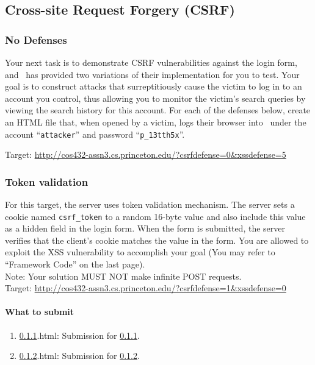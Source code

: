 \documentclass[letterpaper,12pt]{report}
\newcommand{\bungledomain}{http://cos432-assn3.cs.princeton.edu}
\begin{document}
\pagebreak

\subsection{Cross-site Request Forgery (CSRF)}
\label{sec:csrf}

\subsubsection{No Defenses}
\label{sec:csrf_no_defenses}
Your next task is to demonstrate CSRF vulnerabilities against the login form, and \bungle\ has provided two variations of their implementation for you to test.  Your goal is to construct attacks that surreptitiously cause the victim to log in to an account you control, thus allowing you to monitor the victim's search queries by viewing the search history for this account.  For each of the defenses below, create an HTML file that, when opened by a victim, logs their browser into \bungle\ under the account ``\texttt{attacker}'' and password ``\texttt{p\_13tth5x}''.\newline

{Target: \url{\bungledomain/?csrfdefense=0\&xssdefense=5}}

\subsubsection{Token validation}
\label{sec:csrf_tok}
For this target, the server uses token validation mechanism. The server sets a cookie named \texttt{csrf\_token} to a random 16-byte value and also include this value as a hidden field in the login form.  When the form is submitted, the server verifies that the client's cookie matches the value in the form.  You are allowed to exploit the XSS vulnerability to accomplish your goal (You may refer to ``Framework Code'' on the last page).\\
Note: Your solution MUST NOT make infinite POST requests.\\

{Target: \url{\bungledomain/?csrfdefense=1\&xssdefense=0}}\\

\paragraph{What to submit} 
\begin{enumerate}
\item {\ref{sec:csrf_no_defenses}.html}: Submission for \ref{sec:csrf_no_defenses}.
\item {\ref{sec:csrf_tok}.html}: Submission for \ref{sec:csrf_tok}.
\end{enumerate}
\end{document}
